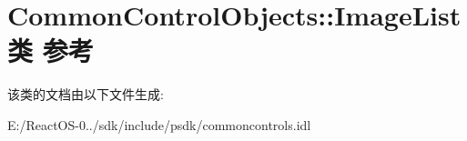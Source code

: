 \hypertarget{class_common_control_objects_1_1_image_list}{}\section{Common\+Control\+Objects\+:\+:Image\+List类 参考}
\label{class_common_control_objects_1_1_image_list}


该类的文档由以下文件生成\+:\begin{DoxyCompactItemize}
\item 
E\+:/\+React\+O\+S-\/0../sdk/include/psdk/commoncontrols.\+idl\end{DoxyCompactItemize}
